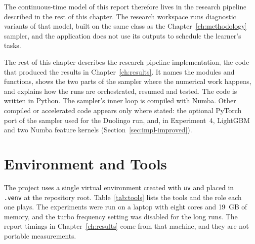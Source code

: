The continuous-time model of this report therefore lives in the research pipeline described in the rest of this chapter. The research workspace runs diagnostic variants of that model, built on the same class as the Chapter~\ref{ch:methodology} sampler, and the application does not use its outputs to schedule the learner's tasks.


The rest of this chapter describes the research pipeline implementation, the code that produced the results in Chapter~\ref{ch:results}. It names the
modules and functions, shows the two parts of the sampler where the numerical work happens, and
explains how the runs are orchestrated, resumed and tested. The code is written in Python. The
sampler's inner loop is compiled with Numba. Other compiled or accelerated code appears only where stated: the optional PyTorch port of the sampler used for the Duolingo run, and, in Experiment~4, LightGBM and two Numba feature kernels (Section~\ref{sec:impl-improved}).

\section{Environment and Tools}
\label{sec:impl-environment}

The project uses a single virtual environment created with \texttt{uv} and placed in \texttt{.venv}
at the repository root. Table~\ref{tab:tools} lists the tools and the role each one plays. The
experiments were run on a laptop with eight cores and 19~GB of memory, and the turbo frequency setting was disabled for the long runs. The report
timings in Chapter~\ref{ch:results} come from that machine, and they are not portable measurements.

